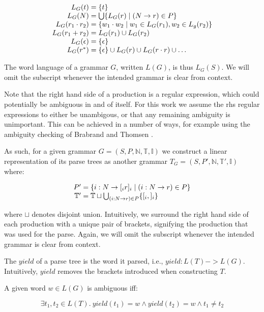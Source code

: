 \documentclass[sigplan]{acmart}\settopmatter{printfolios=true,printccs=false,printacmref=false}
\newcommand{\NT}{\mathbb{N}} %
\newcommand{\T}{\mathbb{T}} %
\newcommand{\I}{\mathbb{I}} %
\newcommand{\yield}{\mathit{yield}} %
\begin{document}
$$
\begin{array}{r@{\;=\;}l}
  L_G(t) & \{t\} \\
  L_G(N) & \bigcup \{L_G(r) \mid (N -> r) \in P\} \\
  L_G(r_1 \cdot r_2) & \{w_1 \cdot w_2 \mid w_1 \in L_G(r_1), w_2 \in L_g(r_2)\} \\
  L_G(r_1 + r_2) & L_G(r_1) \cup L_G(r_2) \\
  L_G(\epsilon) & \{\epsilon\} \\
  L_G(r^{*}) & \{\epsilon\} \cup L_G(r) \cup L_G(r \cdot r) \cup \ldots \\
\end{array}
$$

\noindent The word language of a grammar $G$, written $L(G)$, is thus $L_G(S)$. We will omit the subscript whenever the intended grammar is clear from context.

Note that the right hand side of a production is a regular expression, which could potentially be ambiguous in and of itself. For this work we assume the rhs regular expressions to either be unambigous, or that any remaining ambiguity is unimportant. This can be achieved in a number of ways, for example using the ambiguity checking of Brabrand and Thomsen \cite{brabrandTypedUnambiguousPattern2010}.

As such, for a given grammar $G = (S, P, \NT, \T, \I)$ we construct a linear representation of its parse trees as another grammar $T_G = (S, P', \NT, \T', \I)$ where:

$$
\begin{array}{r@{\;=\;}l}
  P' & \{i : N -> [_i r ]_i \mid (i : N -> r) \in P \} \\
  \T' & \T \sqcup \bigcup_{(i : N -> r) \in P} \{[_i, ]_i \} \\
\end{array}
$$

\noindent where $\sqcup$ denotes disjoint union. Intuitively, we surround the right hand side of each production with a unique pair of brackets, signifying the production that was used for the parse. Again, we will omit the subscript whenever the intended grammar is clear from context.

The $\yield$ of a parse tree is the word it parsed, i.e., $\yield : L(T) -> L(G)$. Intuitively, $\yield$ removes the brackets introduced when constructing $T$.

A given word $w \in L(G)$ is ambiguous iff:

$$\exists t_1, t_2 \in L(T).\ \yield(t_1) = w \land \yield(t_2) = w \land t_1 \neq t_2$$
\end{document}
